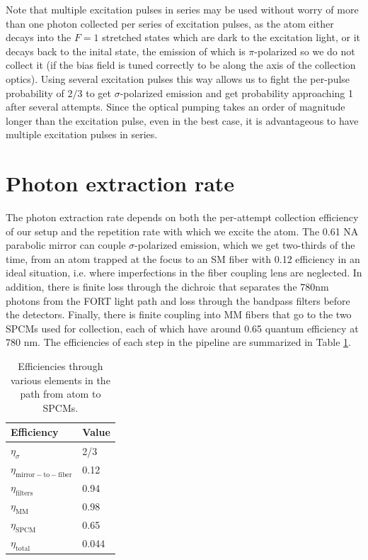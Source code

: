 Note that multiple excitation pulses in series may be used without worry of more than one photon collected per series of excitation pulses, as the atom either decays into the $F=1$ stretched states which are dark to the excitation light, or it decays back to the inital state, the emission of which is $\pi$-polarized so we do not collect it (if the bias field is tuned correctly to be along the axis of the collection optics). Using several excitation pulses this way allows us to fight the per-pulse probability of $2/3$ to get $\sigma$-polarized emission and get probability approaching 1 after several attempts. Since the optical pumping takes an order of magnitude longer than the excitation pulse, even in the best case, it is advantageous to have multiple excitation pulses in series. 

\section{Photon extraction rate}
The photon extraction rate depends on both the per-attempt collection efficiency of our setup and the repetition rate with which we excite the atom. The 0.61 NA parabolic mirror can couple $\sigma$-polarized emission, which we get two-thirds of the time, from an atom trapped at the focus to an SM fiber with 0.12 efficiency in an ideal situation, i.e. where imperfections in the fiber coupling lens are neglected. In addition, there is finite loss through the dichroic that separates the $780 $nm photons from the FORT light path and loss through the bandpass filters before the detectors. Finally, there is finite coupling into MM fibers that go to the two SPCMs used for collection, each of which have around 0.65 quantum efficiency at 780 nm. The efficiencies of each step in the pipeline are summarized in Table \ref{table:collection_efficiency}.

\begin{table}[!h]
    \centering
    \begin{tabular}{ | m{2.2cm}| m{1cm} | }
        \hline
        Efficiency & Value \\
        \hline
        $\eta_{\sigma}$& 2/3 \\ 
        \hline
        $\eta_{\mathrm{mirror-to-fiber}} $& 0.12 \\
        \hline
        $\eta_{\mathrm{filters}} $& 0.94\footnotemark{} \\
        \hline
        $\eta_{\mathrm{MM}} $& 0.98 \\
        \hline
        $\eta_{\mathrm{SPCM}} $& 0.65 \\
        \hline
        $\eta_{\mathrm{total}} $& 0.044 \\
        \hline
    \end{tabular}
    \caption{Efficiencies through various elements in the path from atom to SPCMs.}
    \label{table:collection_efficiency}
\end{table}

